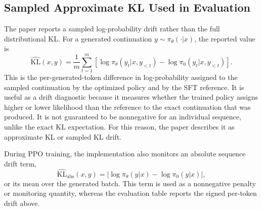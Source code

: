 \documentclass[twocolumn,10pt]{article}
\newcommand{\kl}{\mathrm{KL}}
\begin{document}
\subsection{Sampled Approximate KL Used in Evaluation}
The paper reports a sampled log-probability drift rather than the full distributional KL. For a generated continuation $y\sim\pi_\theta(\cdot|x)$, the reported value is
\begin{equation}
    \widehat{\kl}(x,y)=\frac{1}{m}\sum_{t=1}^{m}
    \left[\log\pi_\theta(y_t|x,y_{<t})-
    \log\pi_0(y_t|x,y_{<t})\right].
\end{equation}
This is the per-generated-token difference in log-probability assigned to the sampled continuation by the optimized policy and by the SFT reference. It is useful as a drift diagnostic because it measures whether the trained policy assigns higher or lower likelihood than the reference to the exact continuation that was produced. It is not guaranteed to be nonnegative for an individual sequence, unlike the exact KL expectation. For this reason, the paper describes it as approximate KL or sampled KL drift.

During PPO training, the implementation also monitors an absolute sequence drift term,
\begin{equation}
    \widehat{\kl}_{\mathrm{abs}}(x,y)=\left|\log\pi_\theta(y|x)-\log\pi_0(y|x)\right|,
\end{equation}
or its mean over the generated batch. This term is used as a nonnegative penalty or monitoring quantity, whereas the evaluation table reports the signed per-token drift above.
\end{document}
